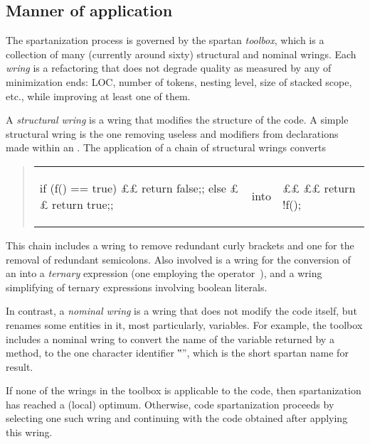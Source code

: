 \subsection{Manner of application}
\label{section:manner}
The spartanization process is governed by the spartan
\emph{toolbox}, which is a collection of many (currently around sixty)
structural and nominal wrings. Each \emph{wring} is a refactoring that does
not degrade quality as measured by any of minimization ends: LOC, number of
tokens, nesting level, size of stacked scope, etc., while improving at least
one of them.

A \emph{structural wring} is a wring that modifies the structure of the
code. A simple structural wring is the one removing useless 
and
 modifiers from declarations made within an .
The application of a chain of structural wrings converts
\vspace{-2ex}

\begin{quote}
\begin{tabular}{m{15ex}m{4ex}m{10ex}}
\begin{java}
if (f() == true) {££
  return false;;
} else {££
  return true;;
}
\end{java}
& into &
\begin{java}
£\relax£ 
£\relax\relax£ 
  return !f();
\end{java}
\end{tabular}
\end{quote}
\vspace{-4ex}

This chain includes a wring to remove redundant curly brackets and one for the
removal of redundant semicolons. Also involved is a wring for the conversion of
an  into a \emph{ternary} expression (one employing the
operator~), and a wring simplifying of ternary expressions
involving boolean literals.

In contrast, a \emph{nominal wring} is a wring that does not modify the
code itself, but renames some entities in it, most particularly, variables.
For example, the toolbox includes a nominal wring to convert the name of the
variable returned by a method, to the one character identifier ‟\cc{\$}”,
which is the short spartan name for result.

If none of the wrings in the toolbox is applicable to the code, then
spartanization has reached a (local) optimum. Otherwise, code spartanization
proceeds by selecting one such wring and continuing with the code obtained
after applying this wring.

